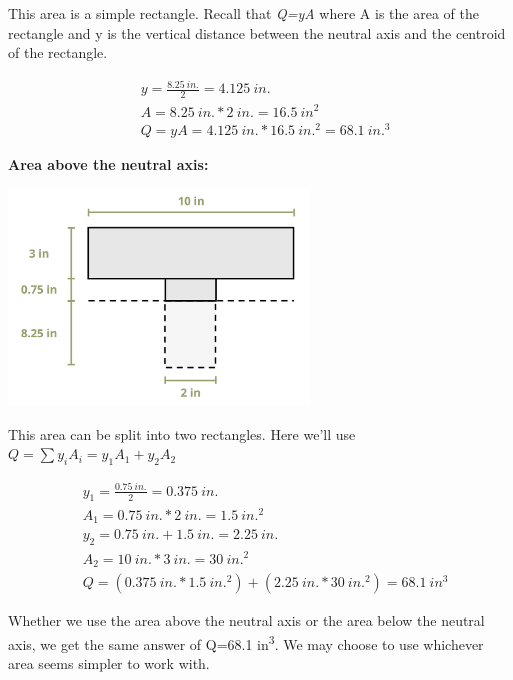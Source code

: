 \documentclass[
  letterpaper,
  DIV=11,
  numbers=noendperiod]{scrreprt}
\theoremstyle{definition}
\theoremstyle{remark}
\begin{document}
\begin{tcolorbox}
\begin{tcolorbox}
This area is a simple rectangle. Recall that \emph{Q=yA} where A is the
area of the rectangle and y is the vertical distance between the neutral
axis and the centroid of the rectangle.

\[
\begin{aligned}
& y=\frac{8.25{~in.}}{2}=4.125{~in.}  \\
& A=8.25{~in.} * 2{~in.}=16.5{~in} ^2 \\
& Q=y A=4.125{~in.} * 16.5{~in.}^2=68.1{~in.}^3
\end{aligned}
\]

\textbf{Area above the neutral axis:}

\begin{center}
\includegraphics[width=3.14583in,height=\textheight]{images/CH10 PNGs/example 10.1 part 4.png}
\end{center}

This area can be split into two rectangles. Here we'll use
\(Q=\sum y_i A_i=y_1 A_1+y_2 A_2\)

\[
\begin{aligned}
& y_1=\frac{0.75{~in.}}{2}=0.375{~in.} \\
& A_1=0.75{~in.} * 2{~in.}=1.5{~in.}^2 \\
& y_2=0.75{~in.}+1.5{~in.}=2.25{~in.} \\
& A_2=10{~in.} * 3{~in.}=30{~in.}^2 \\
& Q=(0.375{~in.} * 1.5{~in.}^2)+(2.25{~in.} * 30{~in.}^2)=68.1{~in}^3
\end{aligned}
\]

Whether we use the area above the neutral axis or the area below the
neutral axis, we get the same answer of Q=68.1 in\textsuperscript{3}. We
may choose to use whichever area seems simpler to work with.

\end{tcolorbox}

\end{tcolorbox}
\end{document}
